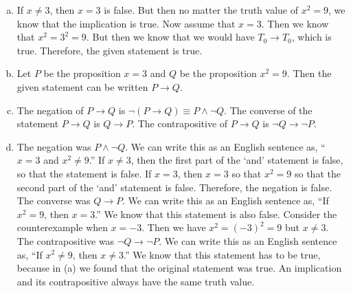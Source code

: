 \documentclass[11pt,letterpaper]{article}
\begin{document}
\sol 
\begin{enumerate}[(a)]
\item If $x \neq 3$, then $x= 3$ is false. But then no matter the truth value of $x^2= 9$, we know that the implication is true. Now assume that $x= 3$. Then we know that $x^2= 3^2= 9$. But then we know that we would have $T_0 \to T_0$, which is true. Therefore, the given statement is true. \pspace

\item Let $P$ be the proposition $x= 3$ and $Q$ be the proposition $x^2= 9$. Then the given statement can be written $P \to Q$. \pspace

\item The negation of $P \to Q$ is $\neg (P \to Q) \equiv P \wedge \neg Q$. The converse of the statement $P \to Q$ is $Q \to P$. The contrapositive of $P \to Q$ is $\neg Q \to \neg P$. \pspace

\item The negation was $P \wedge \neg Q$. We can write this as an English sentence as, ``$x= 3$ and $x^2 \neq 9$.'' If $x \neq 3$, then the first part of the `and' statement is false, so that the statement is false. If $x= 3$, then $x= 3$ so that $x^2= 9$ so that the second part of the `and' statement is false. Therefore, the negation is false. The converse was $Q \to P$. We can write this as an English sentence as, ``If $x^2= 9$, then $x= 3$.'' We know that this statement is also false. Consider the counterexample when $x= -3$. Then we have $x^2= (-3)^2= 9$ but $x \neq 3$. The contrapositive was $\neg Q \to \neg P$. We can write this as an English sentence as, ``If $x^2 \neq 9$, then $x \neq 3$.'' We know that this statement has to be true, because in (a) we found that the original statement was true. An implication and its contrapositive always have the same truth value. 
\end{enumerate}
\end{document}
